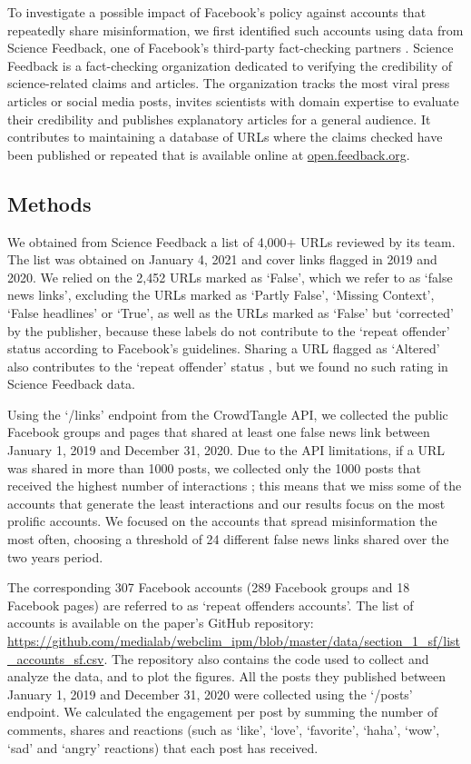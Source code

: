 \documentclass[review]{elsarticle}
\begin{document}
To investigate a possible impact of Facebook’s policy against accounts that repeatedly share misinformation, we first identified such accounts using data from Science Feedback, one of Facebook’s third-party fact-checking partners \cite{sciencefeedbackFbPartner}.
Science Feedback is a fact-checking organization dedicated to verifying the credibility of science-related claims and articles. 
The organization tracks the most viral press articles or social media posts, invites scientists with domain expertise to evaluate their credibility and publishes explanatory articles for a general audience. 
It contributes to maintaining a database of URLs where the claims checked have been published or repeated that is available online at \url{open.feedback.org}.

\subsection{Methods}

We obtained from Science Feedback a list of 4,000+ URLs reviewed by its team. 
The list was obtained on January 4, 2021 and cover links flagged in 2019 and 2020.
We relied on the 2,452 URLs marked as `False', which we refer to as `false news links', excluding the URLs marked as `Partly False', `Missing Context', `False headlines' or `True', as well as the URLs marked as `False' but `corrected' by the publisher, because these labels do not contribute to the `repeat offender' status according to Facebook's guidelines.
Sharing a URL flagged as `Altered' also contributes to the `repeat offender' status \citep{factCheckingRules, repeatOffenderCommunication}, but we found no such rating in Science Feedback data.

Using the `/links' endpoint from the CrowdTangle API, we collected the public Facebook groups and pages that shared at least one false news link between January 1, 2019 and December 31, 2020. 
Due to the API limitations, if a URL was shared in more than 1000 posts, we collected only the 1000 posts that received the highest number of interactions \cite{docCT}; this means that we miss some of the accounts that generate the least interactions and our results focus on the most prolific accounts.
We focused on the accounts that spread misinformation the most often, choosing a threshold of 24 different false news links shared over the two years period. 

The corresponding 307 Facebook accounts (289 Facebook groups and 18 Facebook pages) are referred to as `repeat offenders accounts'. 
The list of accounts is available on the paper’s GitHub repository: \url{https://github.com/medialab/webclim_ipm/blob/master/data/section_1_sf/list_accounts_sf.csv}.
The repository also contains the code used to collect and analyze the data, and to plot the figures.
All the posts they published between January 1, 2019 and December 31, 2020 were collected using the `/posts' endpoint. 
We calculated the engagement per post by summing the number of comments, shares and reactions (such as ‘like’, ‘love’, ‘favorite’, ‘haha’, ‘wow’, ‘sad’ and ‘angry’ reactions) that each post has received.
\end{document}
